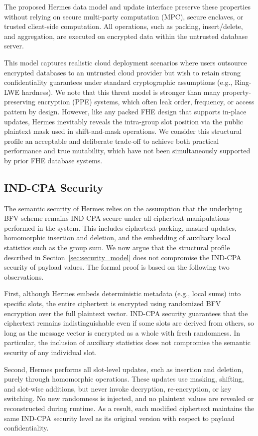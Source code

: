 \documentclass[sigconf,nonacm]{acmart}
\begin{document}
The proposed Hermes data model and update interface preserve these properties without relying on secure multi-party computation (MPC), secure enclaves, or trusted client-side computation. All operations, such as packing, insert/delete, and aggregation, are executed on encrypted data within the untrusted database server.

This model captures realistic cloud deployment scenarios where users outsource encrypted databases to an untrusted cloud provider but wish to retain strong confidentiality guarantees under standard cryptographic assumptions (e.g., Ring-LWE hardness). We note that this threat model is stronger than many property-preserving encryption (PPE) systems, which often leak order, frequency, or access pattern by design. However, like any packed FHE design that supports in-place updates, Hermes inevitably reveals the intra-group slot position via the public plaintext mask used in shift-and-mask operations. We consider this structural profile an acceptable and deliberate trade-off to achieve both practical performance and true mutability, 
which have not been simultaneously supported by prior FHE database systems.

\subsection{IND-CPA Security}

The semantic security of Hermes relies on the assumption that the underlying BFV scheme remains IND-CPA secure under all ciphertext manipulations performed in the system. This includes ciphertext packing, masked updates, homomorphic insertion and deletion, and the embedding of auxiliary local statistics such as the group sum. 
We now argue that the structural profile described in Section~\ref{sec:security_model} does not compromise the IND-CPA security of payload values.
The formal proof is based on the following two observations.

First, although Hermes embeds deterministic metadata (e.g., local sums) into specific slots, the entire ciphertext is encrypted using randomized BFV encryption over the full plaintext vector. IND-CPA security guarantees that the ciphertext remains indistinguishable even if some slots are derived from others, so long as the message vector is encrypted as a whole with fresh randomness. In particular, the inclusion of auxiliary statistics does not compromise the semantic security of any individual slot.

Second, Hermes performs all slot-level updates, such as insertion and deletion, purely through homomorphic operations. These updates use masking, shifting, and slot-wise additions, but never invoke decryption, re-encryption, or key switching. No new randomness is injected, and no plaintext values are revealed or reconstructed during runtime. As a result, each modified ciphertext maintains the same IND-CPA security level as its original version with respect to payload confidentiality.
\end{document}
